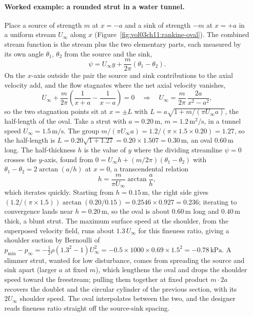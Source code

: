 \paragraph{Worked example: a rounded strut in a water tunnel.} Place a
source of strength $m$ at $x = -a$ and a sink of strength $-m$ at $x =
+a$ in a uniform stream $U_\infty$ along $x$
(Figure~\ref{fig:vol03ch11:rankine-oval}). The combined stream
function is the stream plus the two elementary parts, each measured by
its own angle $\theta_1$, $\theta_2$ from the source and the sink,
\[
\psi = U_\infty y + \frac{m}{2\pi}(\theta_1 - \theta_2).
\]
On the $x$-axis outside the pair the source and sink contributions to
the axial velocity add, and the flow stagnates where the net axial
velocity vanishes,
\[
U_\infty + \frac{m}{2\pi}\!\left(\frac{1}{x + a} - \frac{1}{x - a}
\right) = 0
\quad\Longrightarrow\quad
U_\infty = \frac{m}{2\pi}\,\frac{2a}{x^2 - a^2},
\]
so the two stagnation points sit at $x = \pm L$ with $L = a\sqrt{1 +
m/(\pi U_\infty a)}$, the half-length of the oval. Take a strut with
$a = 0.20\,\si{\meter}$, $m = 1.2\,\si{\meter\squared\per\second}$, in
a tunnel speed $U_\infty = 1.5\,\si{\meter\per\second}$. The group
$m/(\pi U_\infty a) = 1.2/(\pi\times 1.5\times 0.20) = 1.27$, so the
half-length is $L = 0.20\sqrt{1 + 1.27} = 0.20\times 1.507 =
0.30\,\si{\meter}$, an oval $0.60\,\si{\meter}$ long. The half-thickness
$h$ is the value of $y$ where the dividing streamline $\psi = 0$ crosses
the $y$-axis, found from $0 = U_\infty h + (m/2\pi)(\theta_1 -
\theta_2)$ with $\theta_1 - \theta_2 = 2\arctan(a/h)$ at $x = 0$, a
transcendental relation
\[
h = \frac{m}{\pi U_\infty}\arctan\!\frac{a}{h},
\]
which iterates quickly. Starting from $h = 0.15\,\si{\meter}$, the right
side gives $(1.2/(\pi\times 1.5))\arctan(0.20/0.15) = 0.2546\times
0.927 = 0.236$; iterating to convergence lands near $h =
0.20\,\si{\meter}$, so the oval is about $0.60\,\si{\meter}$ long and
$0.40\,\si{\meter}$ thick, a blunt strut. The maximum surface speed at
the shoulder, from the superposed velocity field, runs about $1.3\,
U_\infty$ for this fineness ratio, giving a shoulder suction by
Bernoulli of $p_\text{min} - p_\infty = -\tfrac12\rho(1.3^2 - 1)
U_\infty^2 = -0.5\times 1000\times 0.69\times 1.5^2 =
-0.78\,\text{kPa}$. A slimmer strut, wanted for low disturbance, comes
from spreading the source and sink apart (larger $a$ at fixed $m$),
which lengthens the oval and drops the shoulder speed toward the
freestream; pulling them together at fixed product $m\cdot 2a$ recovers
the doublet and the circular cylinder of the previous section, with its
$2U_\infty$ shoulder speed. The oval interpolates between the two, and
the designer reads fineness ratio straight off the source-sink spacing.

